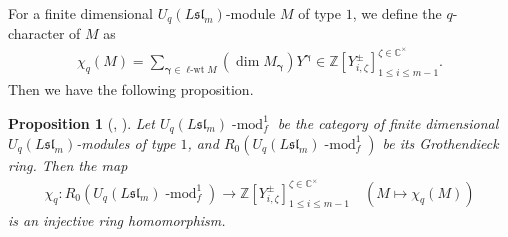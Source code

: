 \documentclass[12pt]{amsart}
\newtheorem{prop}[thm]{Proposition}
\numberwithin{equation}{thm}
\newcommand\CC{\mathbb C}
\newcommand\ZZ{\mathbb Z}
\newcommand\z{\zeta}
\newcommand\Bg{\boldsymbol\gamma}
\newcommand\ra{\rightarrow}
\newcommand\cmod{\operatorname{-mod}}
\newcommand{\lwt}{\operatorname{\ell-wt}}
\newcommand\Fsl{\mathfrak{sl}}
\newcounter{ni}
\newcounter{go}
\begin{document}
For a finite dimensional $U_q(L \Fsl_m)$-module $M$ of type $1$, 
we define the $q$-character  of $M$ as 
\begin{align*}
\chi_q (M) = \sum_{\Bg \in \lwt M} ( \dim M_{\Bg} ) Y^{\Bg} 
\in \ZZ [Y_{i,\z}^{\pm}]^{\z \in \CC^{\times}}_{1 \leq i \leq m-1}. 
\end{align*}
Then we have the following proposition.  

\begin{prop}[{\cite{FR99}, \cite{FM01}}] 
Let $U_q (L\Fsl_m) \cmod_f^1$ be the category of finite dimensional $U_q (L\Fsl_m)$-modules of type $1$, 
and $R_0 (U_q (L\Fsl_m) \cmod_f^1)$ be its Grothendieck ring. 
Then the map 
\begin{align*}
\chi_q : R_0 (U_q (L\Fsl_m)\cmod_f^1) \ra \ZZ [Y_{i,\z}^{\pm}]^{\z \in\CC^{\times}}_{1 \leq i \leq m-1} 
\quad 
(M \mapsto \chi_q (M) )
\end{align*}
is an injective ring homomorphism. 
\end{prop}
\end{document}
